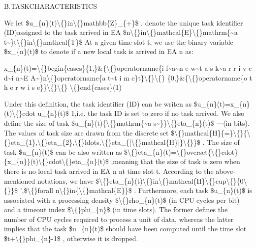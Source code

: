 \documentclass{article}
\begin{document}
B.TASKCHARACTERISTICS

We let \$u\_\{n\}(t)\textbackslash\{\}in\textbackslash\{\}mathbb\{Z\}\_\{+\}\$ . denote the unique task identifier (ID)assigned to the task arrived in EA \$n\textbackslash\{\}in\textbackslash\{\}mathcal\{E\}\textbackslash\{\}mathrm\{\textasciitilde{}a t\textasciitilde{}\}t\textbackslash\{\}in\textbackslash\{\}mathcal\{T\}\$ At a given time slot t, we use the binary variable \$x\_\{n\}(t)\$ to denote if a new local task is arrived in EA n as:

x\_\{n\}(t)=\textbackslash\{\}begin\{cases\}\{1,\}\&\{\textbackslash\{\}operatorname\{i f\textasciitilde{}a\textasciitilde{}n e w\textasciitilde{}t a s k\textasciitilde{}a r r i v e d\textasciitilde{}i n\textasciitilde{}E A\textasciitilde{}\}n\textbackslash\{\}operatorname\{a t\textasciitilde{}t i m e\}t\}\textbackslash\{\}\textbackslash\{\} \{0,\}\&\{\textbackslash\{\}operatorname\{o t h e r w i s e\}\}\textbackslash\{\}\textbackslash\{\} \textbackslash\{\}end\{cases\}(1)

Under this definition, the task identifier (ID) can be writen as \$u\_\{n\}(t)=x\_\{n\}(t)\textbackslash\{\}cdot u\_\{n\}(t)\$ 1,i.e. the task ID is set to zero if no task arrived. We also define the size of task \$u\_\{n\}(t)\{\textbackslash\{\}mathrm\{\textasciitilde{}a s\textasciitilde{}\}\}\textbackslash\{\}eta\_\{n\}(t)\$ 一(in bits). The values of task size are drawn from the discrete set \$\textbackslash\{\}mathcal\{H\}\{=\}\textbackslash\{\}\{\textbackslash\{\}eta\_\{1\},\textbackslash\{\}eta\_\{2\},\textbackslash\{\}ldots,\textbackslash\{\}eta\_\{|\textbackslash\{\}mathcal\{H\}|\}\textbackslash\{\}\}\$ . The size of task \$u\_\{n\}(t)\$ can be also written as \$\textbackslash\{\}eta\_\{n\}(t)=\textbackslash\{\}overset\{\textbackslash\{\}cdot\}\{x\_\{n\}\}(t)\textbackslash\{\}cdot\textbackslash\{\}eta\_\{n\}(t)\$ ,meaning that the size of task is zero when there is no local task arrived in EA n at time slot t. According to the above-mentioned notations, we have \$\textbackslash\{\}eta\_\{n\}(t)\textbackslash\{\}in\textbackslash\{\}mathcal\{H\}\textbackslash\{\}cup\textbackslash\{\}\{0\textbackslash\{\}\}\$ ',\$\textbackslash\{\}forall n\textbackslash\{\}in\{\textbackslash\{\}mathcal\{E\}\}\$ . Furthermore, each task \$u\_\{n\}(t)\$ is associated with a processing density \$\textbackslash\{\}rho\_\{n\}(t)\$ (in CPU cycles per bit) and a timeout index \$\textbackslash\{\}phi\_\{n\}\$ (in time slots). The former defines the number of CPU cycles required to process a unit of data, whereas the latter implies that the task \$u\_\{n\}(t)\$ should have been computed until the time slot \$t+\textbackslash\{\}phi\_\{n\}-1\$ , otherwise it is dropped.
\end{document}
